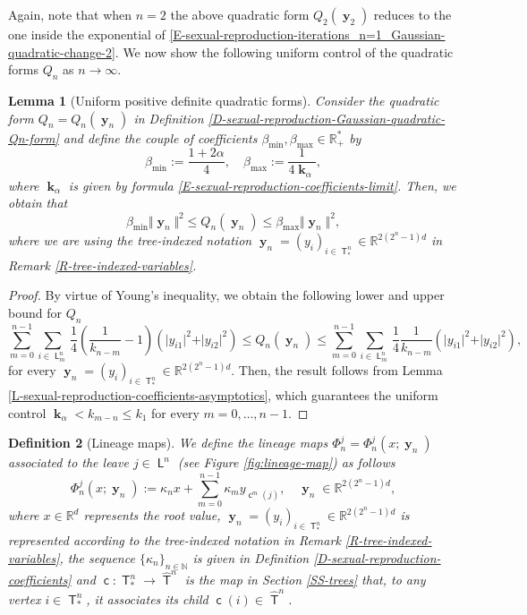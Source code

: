 \documentclass[reqno]{amsart}
\newtheorem{definition}{Definition}[section]
\newtheorem{lemma}[definition]{Lemma}
\DeclareMathOperator{\Tree}{\mathsf{T}}
\DeclareMathOperator{\Leaves}{\mathsf{L}}
\DeclareMathOperator{\Level}{\mathsf{L}}
\DeclareMathOperator{\child}{\mathsf{c}}
\DeclareMathOperator{\bk}{\boldsymbol{k}}
\DeclareMathOperator{\by}{\mathbf{y}}
\numberwithin{equation}{section}
\begin{document}
{Again, note that when $n=2$ the above quadratic form $Q_2(\by_2)$ reduces to the one inside the exponential of \eqref{E-sexual-reproduction-iterations_n=1_Gaussian-quadratic-change-2}. We now show the following uniform control of the quadratic forms $Q_n$ as $n\rightarrow\infty$.

\begin{lemma}[Uniform positive definite quadratic forms]\label{L-sexual-reproduction-control-Qn}
Consider the quadratic form $Q_n=Q_n(\by_n)$ in Definition \ref{D-sexual-reproduction-Gaussian-quadratic-Qn-form} and define the couple of coefficients $\beta_{\min},\beta_{\max}\in \mathbb{R}_+^*$ by
$$\beta_{\min}:=\frac{1+2\alpha}{4},\quad \beta_{\max}:=\frac{1}{4\bk_\alpha},$$
where $\bk_\alpha$ is given by formula \eqref{E-sexual-reproduction-coefficients-limit}. Then, we obtain that
$$\beta_{\min}\Vert \by_n\Vert^2\leq Q_n(\by_n)\leq \beta_{\max}\Vert \by_n\Vert^2,$$
where we are using the tree-indexed notation $\by_n=(y_i)_{i\in \Tree^n_*}\in \mathbb{R}^{2(2^n-1)d}$ in Remark \ref{R-tree-indexed-variables}.
\end{lemma}

\begin{proof}
By virtue of Young's inequality, we obtain the following lower and upper bound for $Q_n$
$$\sum_{m=0}^{n-1}\sum_{i\in \Level_m^n}\frac{1}{4}\left(\frac{1}{k_{n-m}}-1\right)(\vert y_{i1}\vert^2+\vert y_{i2}\vert^2)\leq Q_n(\by_n)\leq \sum_{m=0}^{n-1}\sum_{i\in \Level_m^n}\frac{1}{4}\frac{1}{k_{n-m}}(\vert y_{i1}\vert^2+\vert y_{i2}\vert^2),$$
for every $\by_n=(y_i)_{i\in \Tree^n_*}\in \mathbb{R}^{2(2^n-1)d}$. Then, the result follows from Lemma \ref{L-sexual-reproduction-coefficients-asymptotics}, which guarantees the uniform control $\bk_\alpha< k_{m-n}\leq k_1$ for every $m=0,\ldots,n-1$.
\end{proof}

\begin{definition}[Lineage maps]\label{D-sexual-reproduction-Gaussian-quadratic-lineage-maps}
We define the \textit{lineage maps} $\Phi_n^j=\Phi_n^j(x;\by_n)$ associated to the leave $j\in \Leaves^n$ (see Figure \ref{fig:lineage-map}) as follows
\begin{equation}\label{E-sexual-reproduction-Gaussian-quadratic-lineage-maps}
\Phi_n^j(x;\by_n):=\kappa_n x+\sum_{m=0}^{n-1} \kappa_m y_{\child^m(j)},\quad \by_n\in \mathbb{R}^{2(2^n-1)d},
\end{equation}
where $x\in \mathbb{R}^d$ represents the root value, $\by_n=(y_i)_{i\in \Tree^n_*}\in \mathbb{R}^{2(2^n-1)d}$ is represented according to the tree-indexed notation in Remark \ref{R-tree-indexed-variables}, the sequence $\{\kappa_n\}_{n\in \mathbb{N}}$ is given in Definition \ref{D-sexual-reproduction-coefficients} and $\child:\Tree^n_*\rightarrow \widehat{\Tree}^n$ is the map in Section \ref{SS-trees} that, to any vertex $i\in \Tree^n_*$, it associates its child $\child(i)\in \widehat{\Tree}^n$.
\end{definition}

}
\end{document}
